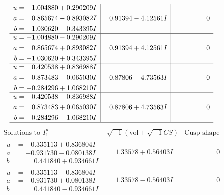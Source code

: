 \documentclass[1p]{elsarticle_modified}
\theoremstyle{definition}
\newcommand{\I}{\sqrt{-1}}
\begin{document}
$$\begin{array}{c|c|c}
\begin{aligned}
u &= -1.004880 + 0.290209 I \\
a &= \phantom{-}0.865674 - 0.893082 I \\
b &= -1.030620 - 0.343395 I\end{aligned}
 & \phantom{-}0.91394 - 4.12561 I & \phantom{-0.000000 } 0 \\ \hline\begin{aligned}
u &= -1.004880 - 0.290209 I \\
a &= \phantom{-}0.865674 + 0.893082 I \\
b &= -1.030620 + 0.343395 I\end{aligned}
 & \phantom{-}0.91394 + 4.12561 I & \phantom{-0.000000 } 0 \\ \hline\begin{aligned}
u &= \phantom{-}0.420538 + 0.836988 I \\
a &= \phantom{-}0.873483 - 0.065030 I \\
b &= -0.284296 + 1.068210 I\end{aligned}
 & \phantom{-}0.87806 - 4.73563 I & \phantom{-0.000000 } 0 \\ \hline\begin{aligned}
u &= \phantom{-}0.420538 - 0.836988 I \\
a &= \phantom{-}0.873483 + 0.065030 I \\
b &= -0.284296 - 1.068210 I\end{aligned}
 & \phantom{-}0.87806 + 4.73563 I & \phantom{-0.000000 } 0\\
 \hline 
 \end{array}$$\newpage$$\begin{array}{c|c|c}  
\text{Solutions to }I^u_{1}& \I (\text{vol} + \sqrt{-1}CS) & \text{Cusp shape}\\
 \hline 
\begin{aligned}
u &= -0.335113 + 0.836804 I \\
a &= -0.931730 - 0.080138 I \\
b &= \phantom{-}0.441840 + 0.934661 I\end{aligned}
 & \phantom{-}1.33578 + 0.56403 I & \phantom{-0.000000 } 0 \\ \hline\begin{aligned}
u &= -0.335113 - 0.836804 I \\
a &= -0.931730 + 0.080138 I \\
b &= \phantom{-}0.441840 - 0.934661 I\end{aligned}
 & \phantom{-}1.33578 - 0.56403 I & \phantom{-0.000000 } 0 \\ \hline\begin{aligned}

\end{aligned}
\end{array}$$
\end{document}
